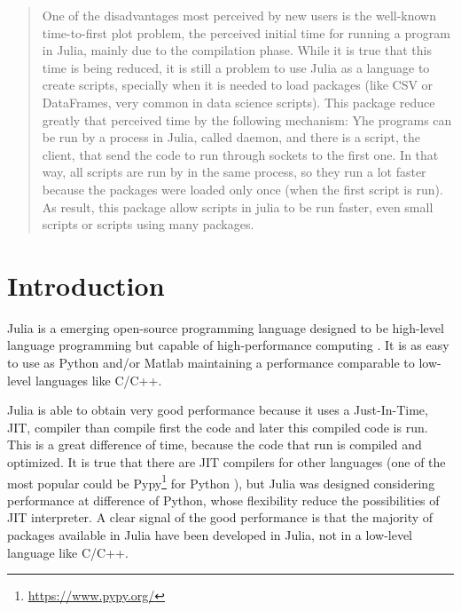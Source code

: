 \documentclass{juliacon}
\begin{document}


\maketitle

\begin{abstract}

  One of the disadvantages most perceived by new users is the well-known
  time-to-first plot problem, the perceived initial time for running a program
  in Julia, mainly due to the compilation phase. While it is true that this time
  is being reduced, it is still a problem to use Julia as a language to create
  scripts, specially when it is needed to load packages (like CSV or DataFrames,
  very common in data science scripts). This package reduce greatly that
  perceived time by the following mechanism: Yhe programs can be run by a
  process in Julia, called daemon, and there is a script, the client, that send
  the code to run through sockets to the first one. In that way, all scripts are
  run by in the same process, so they run a lot faster because the packages were
  loaded only once (when the first script is run). As result, this package allow
  scripts in julia to be run faster, even small scripts or scripts using many
  packages.
\end{abstract}

\section{Introduction}

Julia is a emerging open-source programming language designed to be high-level
language programming but capable of high-performance computing
\cite{bezansonJuliaFreshApproach2017a}. It is as easy to use as Python and/or Matlab
maintaining a performance comparable to low-level languages like C/C++.

Julia is able to obtain very good performance because it uses a Just-In-Time,
JIT, compiler than compile first the code and later this compiled code is
run. This is a great difference of time, because the code that run is compiled
and optimized. It is true that there are JIT compilers for other languages
(one of the most popular could be Pypy\footnote{\url{https://www.pypy.org/}} for
Python \cite{liAssessingOptimizingPerformance2019}), but Julia was designed
considering performance at difference of Python, whose flexibility reduce the
possibilities of JIT interpreter. A clear signal of the good performance is
that the majority of packages available in Julia have been developed in Julia,
not in a low-level language like C/C++.
\end{document}
